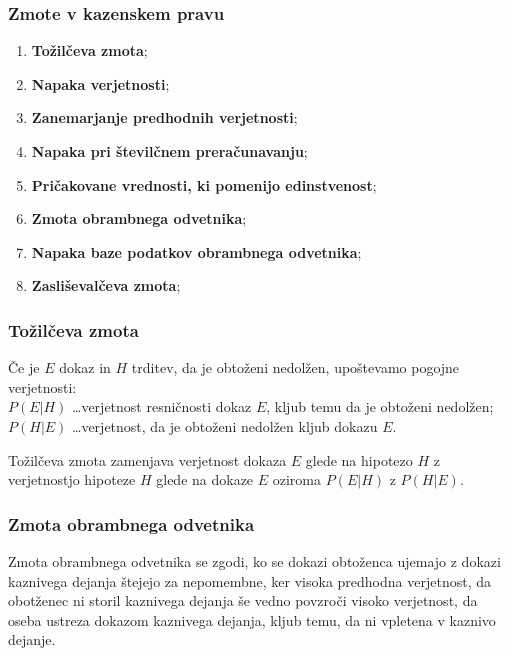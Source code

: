 \documentclass{beamer}
\begin{document}
\begin{frame}
   \frametitle{Zmote v kazenskem pravu}
   \begin{enumerate}
       \item \textbf{Tožilčeva zmota};
       \item \textbf{Napaka verjetnosti};
       \item \textbf{Zanemarjanje predhodnih verjetnosti};
       \item \textbf{Napaka pri številčnem preračunavanju};
       \item \textbf{Pričakovane vrednosti, ki pomenijo edinstvenost};
       \item \textbf{Zmota obrambnega odvetnika};
       \item \textbf{Napaka baze podatkov obrambnega odvetnika};
       \item \textbf{Zasliševalčeva zmota};
   \end{enumerate}
\end{frame}

\begin{frame}
   \frametitle{Tožilčeva zmota}
   Če je $E$ dokaz in $H$ trditev,  da je obtoženi nedolžen, upoštevamo pogojne verjetnosti: \\
   $P(E \lvert H)$ \dots verjetnost resničnosti dokaz $E$, kljub temu da je obtoženi nedolžen; \\
   $P(H \lvert E)$ \dots verjetnost, da je obtoženi nedolžen kljub dokazu $E$. \\ \vspace{2mm}
   \begin{block}{Tožilčeva zmota}
      zamenjava verjetnost dokaza $E$ glede na hipotezo $H$ z verjetnostjo hipoteze $H$ glede na dokaze $E$ oziroma $P(E \lvert H)$ z $P(H \lvert E)$.
   \end{block} \vspace{2mm}
\end{frame}

\begin{frame}
   \frametitle{Zmota obrambnega odvetnika}
   \begin{block}{Zmota obrambnega odvetnika}
      se zgodi, ko se dokazi obtoženca ujemajo z dokazi kaznivega dejanja štejejo za nepomembne, ker visoka predhodna verjetnost, da obotženec ni storil kaznivega dejanja še vedno povzroči visoko verjetnost, da oseba ustreza dokazom kaznivega dejanja, kljub temu, da ni 
      vpletena v kaznivo dejanje.
   \end{block} \vspace{2mm}
\end{frame}
\end{document}
